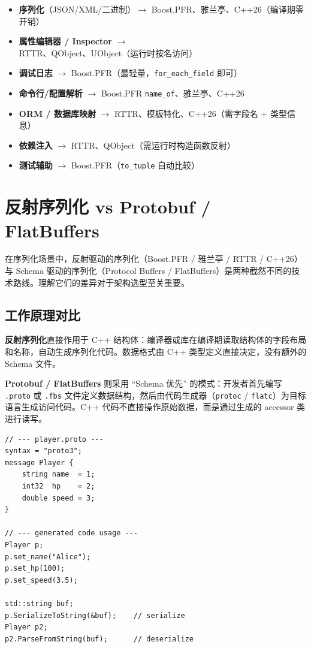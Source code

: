 \documentclass[12pt,a4paper,fontset=fandol]{ctexbook}
\begin{document}
\begin{note}[title={场景与方案选型速查}]
\begin{itemize}[nosep]
  \item \textbf{序列化}（JSON/XML/二进制）$\to$ Boost.PFR、雅兰亭、C++26（编译期零开销）
  \item \textbf{属性编辑器 / Inspector} $\to$ RTTR、QObject、UObject（运行时按名访问）
  \item \textbf{调试日志} $\to$ Boost.PFR（最轻量，\texttt{for\_each\_field} 即可）
  \item \textbf{命令行/配置解析} $\to$ Boost.PFR \texttt{name\_of}、雅兰亭、C++26
  \item \textbf{ORM / 数据库映射} $\to$ RTTR、模板特化、C++26（需字段名 + 类型信息）
  \item \textbf{依赖注入} $\to$ RTTR、QObject（需运行时构造函数反射）
  \item \textbf{测试辅助} $\to$ Boost.PFR（\texttt{to\_tuple} 自动比较）
\end{itemize}
\end{note}

\section{反射序列化 vs Protobuf / FlatBuffers}\label{sec:proto}

在序列化场景中，反射驱动的序列化（Boost.PFR / 雅兰亭 / RTTR / C++26）与 Schema 驱动的序列化（Protocol Buffers / FlatBuffers）是两种截然不同的技术路线。理解它们的差异对于架构选型至关重要。

\subsection{工作原理对比}

\textbf{反射序列化}直接作用于 C++ 结构体：编译器或库在编译期读取结构体的字段布局和名称，自动生成序列化代码。数据格式由 C++ 类型定义直接决定，没有额外的 Schema 文件。

\textbf{Protobuf / FlatBuffers} 则采用 ``Schema 优先'' 的模式：开发者首先编写 \texttt{.proto} 或 \texttt{.fbs} 文件定义数据结构，然后由代码生成器（\texttt{protoc} / \texttt{flatc}）为目标语言生成访问代码。C++ 代码不直接操作原始数据，而是通过生成的 accessor 类进行读写。

\begin{lstlisting}[caption={Protobuf: Schema 优先}]
// --- player.proto ---
syntax = "proto3";
message Player {
    string name  = 1;
    int32  hp    = 2;
    double speed = 3;
}

// --- generated code usage ---
Player p;
p.set_name("Alice");
p.set_hp(100);
p.set_speed(3.5);

std::string buf;
p.SerializeToString(&buf);    // serialize
Player p2;
p2.ParseFromString(buf);      // deserialize
\end{lstlisting}
\end{document}
